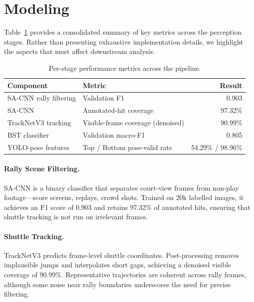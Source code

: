\section{Modeling}

Table~\ref{tab:components} provides a consolidated summary of key metrics across
the perception stages. Rather than presenting exhaustive implementation details,
we highlight the aspects that most affect downstream analysis.

\begin{table}[t]
  \caption{Per-stage performance metrics across the \method{} pipeline.}
  \label{tab:components}
  \centering
  \small
  \begin{tabular}{llr}
    \toprule
    Component & Metric & Result \\
    \midrule
    SA-CNN rally filtering & Validation F1 & 0.903 \\
    SA-CNN & Annotated-hit coverage & 97.32\% \\
    TrackNetV3 tracking & Visible-frame coverage (denoised) & 90.99\% \\
    BST classifier & Validation macro-F1 & 0.805 \\
    YOLO-pose features & Top / Bottom pose-valid rate & 54.29\% / 98.96\% \\
    \bottomrule
  \end{tabular}
\end{table}

\paragraph{Rally Scene Filtering.}
SA-CNN is a binary classifier that separates court-view frames from non-play
footage—score screens, replays, crowd shots. Trained on 20k labelled images, it
achieves an F1 score of 0.903 and retains 97.32\% of annotated hits, ensuring
that shuttle tracking is not run on irrelevant frames.

\paragraph{Shuttle Tracking.}
TrackNetV3 predicts frame-level shuttle coordinates. Post-processing removes
implausible jumps and interpolates short gaps, achieving a denoised visible
coverage of 90.99\%. Representative trajectories are coherent across rally
frames, although some noise near rally boundaries underscores the need for
precise filtering.


